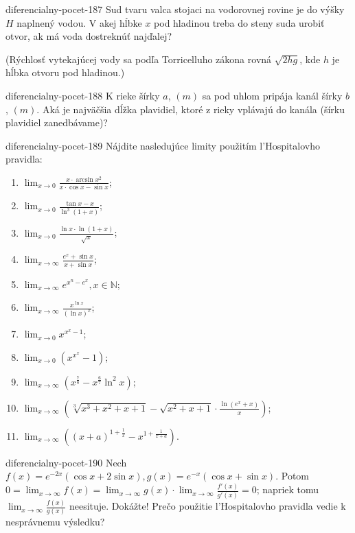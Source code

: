 \begin{defproblem}{diferencialny-pocet-187}
Sud tvaru valca stojaci na vodorovnej rovine je do výšky $H$ naplnený vodou. V akej hĺbke $x$ pod hladinou treba do steny suda urobiť otvor, ak má voda dostreknúť najďalej?

(Rýchlosť vytekajúcej vody sa podľa Torricelluho zákona rovná $\sqrt{2hg}$, kde $h$ je hĺbka otvoru pod hladinou.)
\end{defproblem}

\begin{defproblem}{diferencialny-pocet-188}
K rieke šírky $a$, $(m)$ sa pod uhlom pripája kanál šírky $b$, $(m)$. Aká je najväčšia dĺžka plavidiel, ktoré z rieky vplávajú do kanála (šírku plavidiel zanedbávame)?
\end{defproblem}

\begin{defproblem}{diferencialny-pocet-189}
Nájdite nasledujúce limity použitím l'Hospitalovho pravidla:
\begin{multicols}{2}
\begin{enumerate}
    \item $\lim_{x\rightarrow 0}\frac{x\cdot\arcsin x^2}{x\cdot\cos x -\sin x}$;
	\item $\lim_{x\rightarrow 0}\frac{\tan x -x}{\ln^3 (1+x)}$;
	\item $\lim_{x\rightarrow 0}\frac{\ln x\cdot\ln (1+x)}{\sqrt{x}}$;
	\item $\lim_{x\rightarrow \infty}\frac{e^x+\sin x}{x+\sin x}$;
	\item $\lim_{x\rightarrow \infty}e^{x^n-e^x},x\in\mathbb{N}$;
	\item $\lim_{x\rightarrow \infty}\frac{x^{\ln x}}{(\ln x)^x}$;
	\item $\lim_{x\rightarrow 0}x^{x^x-1}$;
	\item $\lim_{x\rightarrow 0}(x^{x^x}-1)$;
	\item $\lim_{x\rightarrow \infty}(x^{\frac{7}{8}}-x^{\frac{6}{7}}\ln^2 x)$;
	\item $\lim_{x\rightarrow \infty}(\sqrt[3]{x^3+x^2+x+1}-\sqrt{x^2+x+1}\cdot\frac{\ln (e^x+x)}{x})$;
	\item $\lim_{x\rightarrow \infty}((x+a)^{1+\frac{1}{x}}-x^{1+\frac{1}{x+a}})$.
\end{enumerate}
\end{multicols}
\end{defproblem}

\begin{defproblem}{diferencialny-pocet-190}
Nech $f(x)=e^{-2x}(\cos x+2\sin x),g(x)=e^{-x}(\cos x +\sin x)$. Potom $0=\lim_{x\rightarrow\infty}f(x)=\lim_{x\rightarrow\infty}g(x)\cdot\lim_{x\rightarrow\infty}\frac{f'(x)}{g'(x)}=0$; napriek tomu $\lim_{x\rightarrow\infty}\frac{f(x)}{g(x)}$ neesituje. Dokážte! Prečo použitie l'Hospitalovho pravidla vedie k nesprávnemu výsledku?
\end{defproblem}

